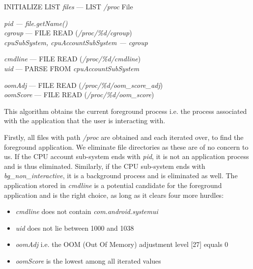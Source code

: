 \documentclass[12pt]{uthesis-v12}  %
\begin{document}
			\begin{algorithm}[H]
				\SetAlgoLined
				
				INITIALIZE LIST {\em files} --- LIST {\em /proc} File\\
				{
					
					{\em pid --- file.getName()}\\
					{\em cgroup} --- FILE READ ({\em /proc/\%d/cgroup})\\
					{\em cpuSubSystem, cpuAccountSubSystem --- cgroup}\\
					
					
					{\em cmdline} --- FILE READ ({\em /proc/\%d/cmdline})\\
					{\em uid} --- PARSE FROM {\em cpuAccountSubSystem}\\
					
					
					{\em oomAdj} --- FILE READ ({\em /proc/\%d/oom\_score\_adj})\\
					{\em oomScore} --- FILE READ ({\em /proc/\%d/oom\_score})\\
					
				}
				
				\caption[Algorithm to get current foreground application]{This algorithm obtains the current foreground process i.e. the process associated with the application that the user is interacting with.}
			\end{algorithm}
			
			Firstly, all files with path {\em /proc} are obtained and each iterated over, to find the foreground application. We eliminate file directories as these are of no concern to us. If the CPU account sub-system ends with {\em pid}, it is not an application process and is thus eliminated. Similarly, if the CPU sub-system ends with {\em bg\_non\_interactive}, it is a background process and is eliminated as well. The application stored in {\em cmdline} is a potential candidate for the foreground application and is the right choice, as long as it clears four more hurdles:
			
			\begin{itemize}
				\item {\em cmdline} does not contain {\em com.android.systemui}
				\item {\em uid} does not lie between 1000 and 1038
				\item {\em oomAdj} i.e. the OOM (Out Of Memory) adjustment level [27] equals 0
				\item {\em oomScore} is the lowest among all iterated values
			\end{itemize}
			
\end{document}
